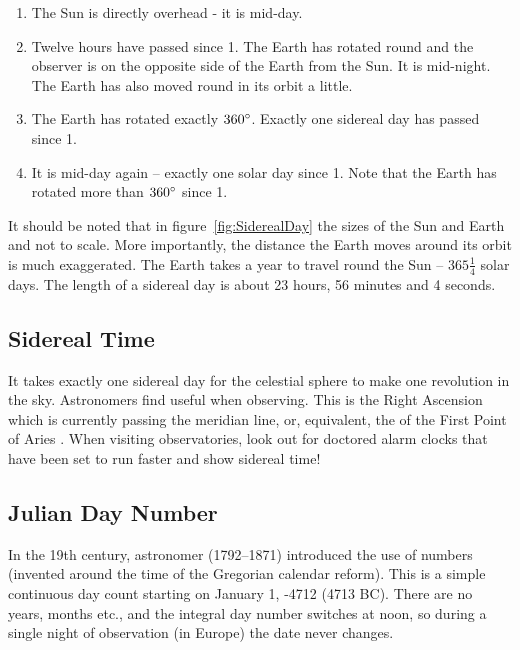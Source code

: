 \begin{enumerate}
\item
  The Sun is directly overhead - it is mid-day.
\item
  Twelve hours have passed since 1. The Earth has rotated round and the
  observer is on the opposite side of the Earth from the Sun. It is
  mid-night. The Earth has also moved round in its orbit a little.
\item
  The Earth has rotated exactly $360\degree$. Exactly one sidereal day has
  passed since 1.
\item
  It is mid-day again -- exactly one solar day since 1. Note that the
  Earth has rotated more than $360\degree$ since 1.
\end{enumerate}

\noindent It should be noted that in figure~\ref{fig:SiderealDay} the sizes of
the Sun and Earth and not to scale. More importantly, the distance the
Earth moves around its orbit is much exaggerated. The Earth takes a
year to travel round the Sun --
$365\frac{1}{4}$ solar days. The length of a
sidereal day is about 23 hours, 56 minutes and 4 seconds.

\subsection{Sidereal Time}
\label{sec:Concepts:SiderealTime}

It takes exactly one sidereal day for the celestial sphere to make one
revolution in the sky. Astronomers find 
useful when observing. This is the Right Ascension which is currently
passing the meridian line, or, equivalent, the 
of the First Point of Aries \Aries.  When visiting observatories, look
out for doctored alarm clocks that have been set to run faster and
show sidereal time!

\subsection{Julian Day Number}
\label{sec:Concepts:JulianDay}

In the 19th century, astronomer  (1792--1871) introduced the use of
 numbers (invented around the time of the Gregorian calendar
reform). This is a simple continuous day count starting on January 1, -4712
(4713 BC). There are no years, months etc., and the integral day
number switches at noon, so during a single night of observation (in
Europe) the date never changes. 

